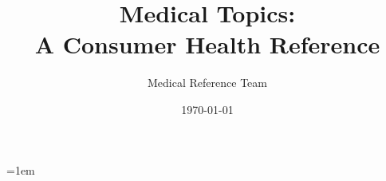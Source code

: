\usepackage[utf8]{inputenc}
\usepackage[T1]{fontenc}
\usepackage{lmodern}
\usepackage[margin=1in]{geometry}
\usepackage{graphicx}
\usepackage{booktabs}
\usepackage{enumitem}
\usepackage{xcolor}
\usepackage{hyperref}
\usepackage{tocloft}
\usepackage{makeidx}
\usepackage{microtype}
\usepackage{fancyhdr}
\usepackage{truncate}

\setlength{\headheight}{14.5pt}
\emergencystretch=1em

\pagestyle{fancy}
\fancyhf{}
\fancyhead[L]{\small\textsl{\truncate{0.85\headwidth}{\leftmark}}}
\fancyhead[R]{\small\thepage}
\renewcommand{\headrulewidth}{0.4pt}
\fancypagestyle{plain}{%
    \fancyhf{}%
    \renewcommand{\headrulewidth}{0pt}%
    \fancyfoot[C]{\small\thepage}%
}

\renewcommand{\cftchapnumwidth}{3em}


\title{Medical Topics:\\ A Consumer Health Reference}
\author{Medical Reference Team}
\date{\today}

\makeindex

\makeatletter
\renewenvironment{thebibliography}[1]
     {\list{\@biblabel{\@arabic\c@enumiv}}\%
           {\settowidth\labelwidth{\@biblabel{#1}}\%
            \leftmargin\labelwidth
            \advance\leftmargin\labelsep
            \@openbib@code
            \usecounter{enumiv}\%
            \let\p@enumiv\@empty
            \renewcommand\theenumiv{\@arabic\c@enumiv}}\%
      \sloppy
      \clubpenalty4000
      \@clubpenalty \clubpenalty
      \widowpenalty4000\%
      \sfcode`\.@m}
     {\def\@noitemerr
       {\@latex@warning{Empty `thebibliography' environment}}\%
      \endlist}

\renewenvironment{theindex}{%
  \if@twocolumn\@restonecolfalse\else\@restonecoltrue\fi
  \columnseprule\z@
  \columnsep 35\p@
  \twocolumn[\@makeschapterhead{\indexname}]%
  \thispagestyle{plain}\parindent\z@
  \parskip\z@\@plus .3\p@\relax
  \let\item\@idxitem
  \raggedright
}{%
  \if@restonecol\onecolumn\else\clearpage\fi}
\makeatother
